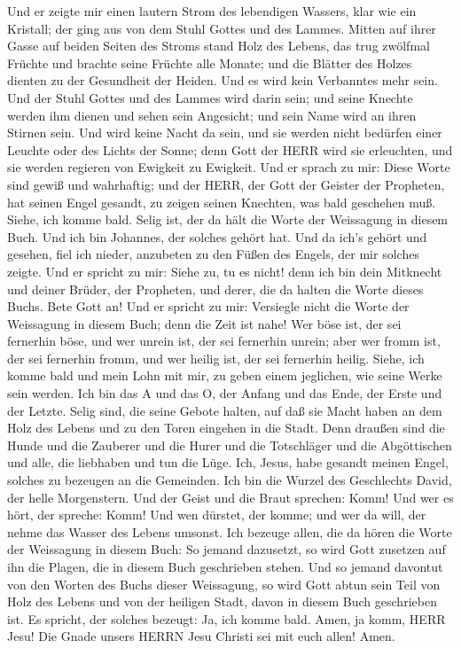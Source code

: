  Und er zeigte mir einen lautern Strom des lebendigen
Wassers, klar wie ein Kristall; der ging aus von dem Stuhl Gottes und
des Lammes.  Mitten auf ihrer Gasse auf beiden Seiten des
Stroms stand Holz des Lebens, das trug zwölfmal Früchte und brachte
seine Früchte alle Monate; und die Blätter des Holzes dienten zu der
Gesundheit der Heiden.  Und es wird kein Verbanntes mehr
sein. Und der Stuhl Gottes und des Lammes wird darin sein; und seine
Knechte werden ihm dienen  und sehen sein Angesicht; und
sein Name wird an ihren Stirnen sein.  Und wird keine Nacht
da sein, und sie werden nicht bedürfen einer Leuchte oder des Lichts der
Sonne; denn Gott der HERR wird sie erleuchten, und sie werden regieren
von Ewigkeit zu Ewigkeit.  Und er sprach zu mir: Diese Worte
sind gewiß und wahrhaftig; und der HERR, der Gott der Geister der
Propheten, hat seinen Engel gesandt, zu zeigen seinen Knechten, was bald
geschehen muß.  Siehe, ich komme bald. Selig ist, der da
hält die Worte der Weissagung in diesem Buch.  Und ich bin
Johannes, der solches gehört hat. Und da ich's gehört und gesehen, fiel
ich nieder, anzubeten zu den Füßen des Engels, der mir solches zeigte.
 Und er spricht zu mir: Siehe zu, tu es nicht! denn ich bin
dein Mitknecht und deiner Brüder, der Propheten, und derer, die da
halten die Worte dieses Buchs. Bete Gott an!  Und er
spricht zu mir: Versiegle nicht die Worte der Weissagung in diesem Buch;
denn die Zeit ist nahe!  Wer böse ist, der sei fernerhin
böse, und wer unrein ist, der sei fernerhin unrein; aber wer fromm ist,
der sei fernerhin fromm, und wer heilig ist, der sei fernerhin heilig.
 Siehe, ich komme bald und mein Lohn mit mir, zu geben
einem jeglichen, wie seine Werke sein werden.  Ich bin das
A und das O, der Anfang und das Ende, der Erste und der Letzte.
 Selig sind, die seine Gebote halten, auf daß sie Macht
haben an dem Holz des Lebens und zu den Toren eingehen in die Stadt.
 Denn draußen sind die Hunde und die Zauberer und die Hurer
und die Totschläger und die Abgöttischen und alle, die liebhaben und tun
die Lüge.  Ich, Jesus, habe gesandt meinen Engel, solches
zu bezeugen an die Gemeinden. Ich bin die Wurzel des Geschlechts David,
der helle Morgenstern.  Und der Geist und die Braut
sprechen: Komm! Und wer es hört, der spreche: Komm! Und wen dürstet, der
komme; und wer da will, der nehme das Wasser des Lebens umsonst.
 Ich bezeuge allen, die da hören die Worte der Weissagung
in diesem Buch: So jemand dazusetzt, so wird Gott zusetzen auf ihn die
Plagen, die in diesem Buch geschrieben stehen.  Und so
jemand davontut von den Worten des Buchs dieser Weissagung, so wird Gott
abtun sein Teil von Holz des Lebens und von der heiligen Stadt, davon in
diesem Buch geschrieben ist.  Es spricht, der solches
bezeugt: Ja, ich komme bald. Amen, ja komm, HERR Jesu!  Die
Gnade unsers HERRN Jesu Christi sei mit euch allen! Amen.
